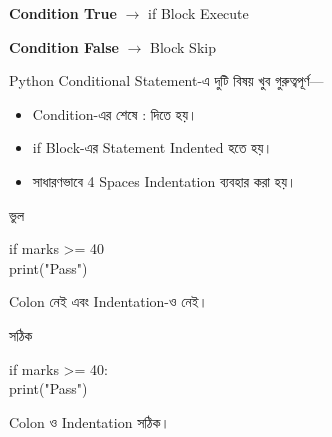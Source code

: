 \begin{center}

\textbf{Condition True}
\(\longrightarrow\)
\textenglish{\ttfamily if}
Block Execute

\qquad

\textbf{Condition False}
\(\longrightarrow\)
Block Skip

\end{center}



Python Conditional Statement-এ দুটি বিষয় খুব গুরুত্বপূর্ণ—

\begin{itemize}

\item Condition-এর শেষে
\textenglish{\ttfamily :}
দিতে হয়।

\item
\textenglish{\ttfamily if}
Block-এর Statement Indented হতে হয়।

\item সাধারণভাবে 4 Spaces Indentation ব্যবহার করা হয়।

\end{itemize}

\noindent
\begin{minipage}[t]{0.49\linewidth}

\begin{sideexamplebox}{ভুল}

\begin{sidecodebox}
\begin{english}
\ttfamily
if marks >= 40\\
print("Pass")
\end{english}
\end{sidecodebox}

Colon নেই এবং Indentation-ও নেই।

\end{sideexamplebox}

\end{minipage}
\hfill
\begin{minipage}[t]{0.49\linewidth}

\begin{sideexamplebox}{সঠিক}

\begin{sidecodebox}
\begin{english}
\ttfamily
if marks >= 40:\\
\hspace*{4mm}print("Pass")
\end{english}
\end{sidecodebox}

Colon ও Indentation সঠিক।

\end{sideexamplebox}

\end{minipage}


